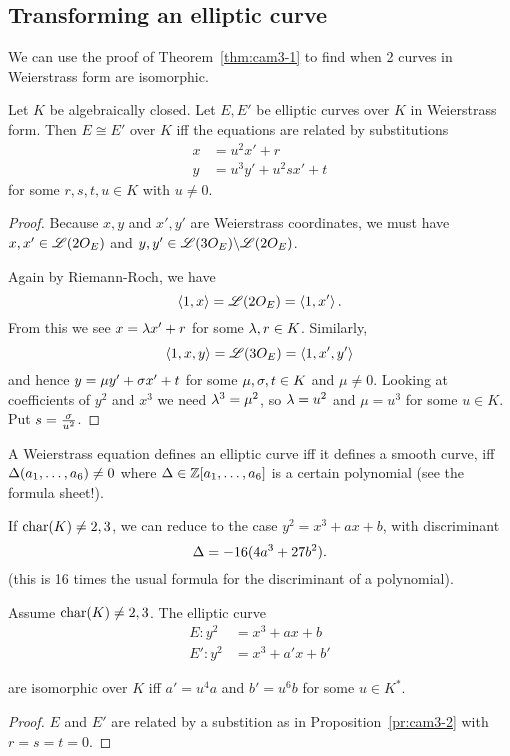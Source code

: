 \subsection{Transforming an elliptic curve}
We can use the proof of Theorem~\ref{thm:cam3-1} to find when 2 curves in Weierstrass form are isomorphic.
\begin{pr}
Let $K$ be algebraically closed.
Let $E,E'$ be elliptic curves over $K$ in Weierstrass form. Then $E\cong E'$ over $K$ iff the equations are related by substitutions 
\begin{align*}
x&=u^2x'+r\\
y&=u^3y'+u^2sx'+t
\end{align*}
for some $r,s,t,u\in K$ with $u\ne 0$.
\end{pr}
\begin{proof}
Because $x,y$ and $x',y'$ are Weierstrass coordinates, we must have $x,x'\in \mathscr{L}(2O_E)$ and $y,y'\in \mathscr{L}(3O_E)\backslash \mathscr{L}(2O_E)$. %

Again by Riemann-Roch, we have
\[
\left\langle {1,x}\right\rangle=\mathscr{L}(2O_E)=\left\langle {1,x'}\right\rangle.
\]
From this we see $x=\lambda x'+r$ for some $\lambda,r\in K$. Similarly,
\[
\left\langle {1,x,y}\right\rangle=\mathscr{L}(3O_E)=\left\langle {1,x',y'}\right\rangle
\]
and hence $y=\mu y' +\sigma x' + t$ for some $\mu,\sigma,t\in K$ and $\mu\ne 0$. Looking at coefficients of $y^2$ and $x^3$ we need $\lambda^3=\mu^2$, so $\lambda=u^2$ and $\mu=u^3$ for some $u\in K$. Put $s=\frac{\sigma}{u^2}$.
\end{proof}

A Weierstrass equation defines an elliptic curve iff it defines a smooth curve, iff $\Delta(a_1,\ldots, a_6)\ne 0$ where $\Delta\in \mathbb{Z}[a_1,\ldots, a_6]$ is a certain polynomial (see the formula sheet!).

If $\operatorname{char}(K)\ne 2,3$, we can reduce to the case $y^2=x^3+ax+b$, with discriminant
\[
\Delta=-16(4a^3+27b^2).
\]
(this is 16 times the usual formula for the discriminant of a polynomial).

\begin{cor}
Assume $\operatorname{char}(K)\ne 2,3$. The elliptic curve 
\begin{align*}
E:y^2&=x^3+ax+b\\
E':y^2&=x^3+a'x+b'
\end{align*}
\end{cor}
are isomorphic over $K$ iff $a'=u^4a$ and $b'=u^6b$ for some $u\in K^*$.
\begin{proof}
$E$ and $E'$ are related by a substition as in Proposition~\ref{pr:cam3-2} with $r=s=t=0$. 
\end{proof}

